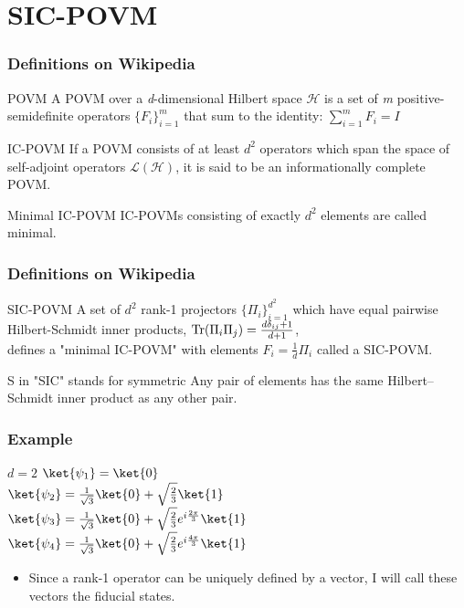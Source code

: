 \documentclass{beamer}
\begin{document}
\section{SIC-POVM}
\begin{frame}
  \frametitle{Definitions on Wikipedia}
  \begin{block}{POVM}
    A POVM over a \textit{d}-dimensional Hilbert space $\mathcal{H}$ is a set of
    \textit{m} positive-semidefinite operators ${\{F_{i}\}^{m}_{i=1}}$ that sum to the identity:
    $\sum_{i=1}^{m}F_{i}=I$
  \end{block}
  \begin{block}{IC-POVM}
    If a POVM consists of at least $d^2$ operators which span the space of self-adjoint operators
    $\mathcal{L(H)}$, it is said to be an informationally complete POVM.
  \end{block}
  \begin{block}{Minimal IC-POVM}
    IC-POVMs consisting of exactly $d^2$ elements are called minimal.
  \end{block}
\end{frame}

\begin{frame}
  \frametitle{Definitions on Wikipedia}
  \begin{block}{SIC-POVM}
    A set of $d^2$ rank-1 projectors ${\{\Pi_{i}\}^{d^2}_{i=1}}$
    which have equal pairwise Hilbert-Schmidt inner products,
    $\textnormal{Tr} (\Pi_{i}\Pi_{j})=\frac{d\delta_{ij}+1}{d+1}$,\\
    defines a "minimal IC-POVM" with elements $F_{i}=\frac{1}{d}\Pi_{i}$
    called a SIC-POVM.
  \end{block}
  \begin{alertblock}{S in "SIC" stands for symmetric}
    Any pair of elements has the same Hilbert–Schmidt inner product as any other pair.
  \end{alertblock}
\end{frame}

\begin{frame}
  \frametitle{Example}
  \begin{block}{$d = 2$}
    $\ket{\psi_{1}} = \ket{0}$\\
    $\ket{\psi_{2}} = \frac{1}{\sqrt{3}}\ket{0} + \sqrt{\frac{2}{3}}\ket{1}$\\
    $\ket{\psi_{3}} = \frac{1}{\sqrt{3}}\ket{0} + \sqrt{\frac{2}{3}} e^{i\frac{2\pi}{3}}\ket{1}$\\
    $\ket{\psi_{4}} = \frac{1}{\sqrt{3}}\ket{0} + \sqrt{\frac{2}{3}} e^{i\frac{4\pi}{3}}\ket{1}$\\
  \end{block}
  \begin{itemize}
    \item Since a rank-1 operator can be uniquely defined by a vector, I will call these vectors the fiducial states.
  \end{itemize}
\end{frame}
\end{document}
